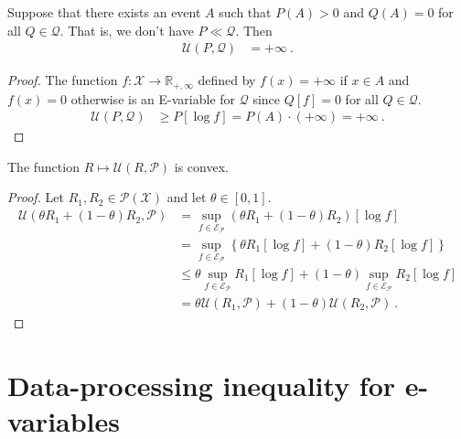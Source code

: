 \begin{lemma}\label{lem:maxUtility_eq_top_of_not_acSet}
Suppose that there exists an event $A$ such that $P(A) > 0$ and $Q(A) = 0$ for all $Q \in \mathcal{Q}$. That is, we don't have $P \ll \mathcal{Q}$.
Then
\begin{align*}
  \mathcal{U}(P, \mathcal{Q})
  &= +\infty
  \: .
\end{align*}
\end{lemma}

\begin{proof}
The function $f : \mathcal{X} \to \mathbb{R}_{+,\infty}$ defined by $f(x) = +\infty$ if $x \in A$ and $f(x) = 0$ otherwise is an E-variable for $\mathcal{Q}$ since $Q[f] = 0$ for all $Q \in \mathcal{Q}$.
\begin{align*}
  \mathcal{U}(P, \mathcal{Q})
  &\ge P[\log f]
  = P(A) \cdot (+\infty)
  = +\infty
  \: .
\end{align*}
\end{proof}


\begin{lemma}\label{lem:convex_maxUtility}
  \leanok
The function $R \mapsto \mathcal{U}(R, \mathcal{P})$ is convex.
\end{lemma}

\begin{proof}\leanok
Let $R_1, R_2 \in \mathcal{P}(\mathcal{X})$ and let $\theta \in [0,1]$.
\begin{align*}
  \mathcal{U}(\theta R_1 + (1 - \theta) R_2, \mathcal{P})
  &= \sup_{f \in \mathcal{E}_{\mathcal{P}}} (\theta R_1 + (1 - \theta) R_2)\left[\log f\right]
  \\
  &= \sup_{f \in \mathcal{E}_{\mathcal{P}}} \left\{\theta R_1[\log f] + (1 - \theta) R_2[\log f]\right\}
  \\
  &\le \theta \sup_{f \in \mathcal{E}_{\mathcal{P}}} R_1[\log f] + (1 - \theta) \sup_{f \in \mathcal{E}_{\mathcal{P}}} R_2[\log f]
  \\
  &= \theta \mathcal{U}(R_1, \mathcal{P}) + (1 - \theta) \mathcal{U}(R_2, \mathcal{P})
  \: .
\end{align*}
\end{proof}



\section{Data-processing inequality for e-variables}
\label{sec:data_processing_eVar}


